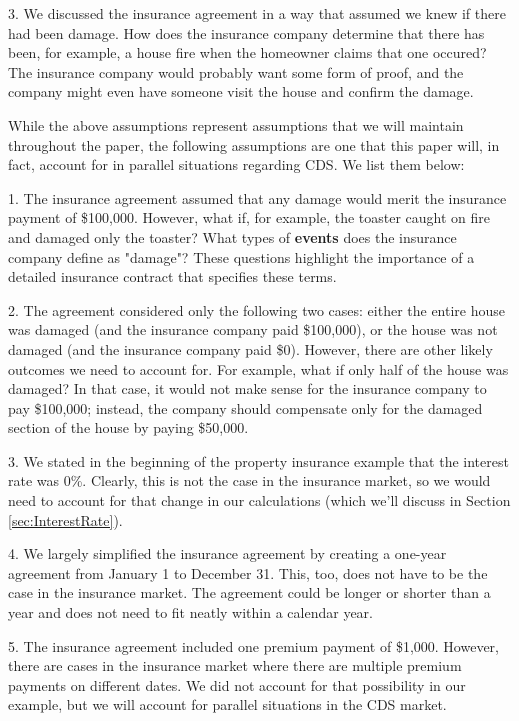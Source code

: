 \documentclass[article]{jss}
\begin{document}
3. We discussed the insurance agreement in a way that assumed we knew if there had been damage. How does the insurance company determine that there has been, for example, a house fire when the homeowner claims that one occured? The insurance company would probably want some form of proof, and the company might even have someone visit the house and confirm the damage. 

While the above assumptions represent assumptions that we will maintain throughout the paper, the following assumptions are one that this paper will, in fact, account for in parallel situations regarding CDS. We list them below:

1. The insurance agreement assumed that any damage would merit the insurance payment of \$100,000. However, what if, for example, the toaster caught on fire and damaged only the toaster? What types of \textbf{events} does the insurance company define as "damage"? These questions highlight the importance of a detailed insurance contract that specifies these terms.

2. The agreement considered only the following two cases: either the entire house was damaged (and the insurance company paid \$100,000), or the house was not damaged (and the insurance company paid \$0). However, there are other likely outcomes we need to account for. For example, what if only half of the house was damaged? In that case, it would not make sense for the insurance company to pay \$100,000; instead, the company should compensate only for the damaged section of the house by paying \$50,000. 

3. We stated in the beginning of the property insurance example that the interest rate was 0\%. Clearly, this is not the case in the insurance market, so we would need to account for that change in our calculations (which we'll discuss in Section \ref{sec:InterestRate}).

4. We largely simplified the insurance agreement by creating a one-year agreement from January 1 to December 31. This, too, does not have to be the case in the insurance market. The agreement could be longer or shorter than a year and does not need to fit neatly within a calendar year.

5. The insurance agreement included one premium payment of \$1,000. However, there are cases in the insurance market where there are multiple premium payments on different dates. We did not account for that possibility in our example, but we will account for parallel situations in the CDS market.
\end{document}
